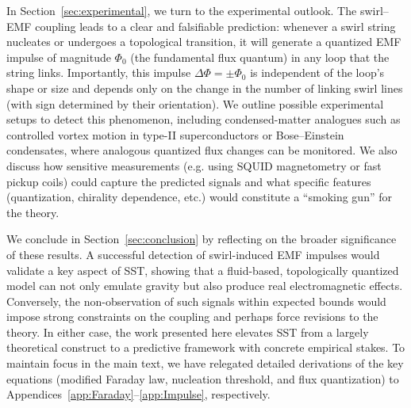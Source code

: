 \documentclass[12pt]{article}
\begin{document}
    In Section~\ref{sec:experimental}, we turn to the experimental outlook. The swirl–EMF coupling leads to a clear and falsifiable prediction: whenever a swirl string nucleates or undergoes a topological transition, it will generate a quantized EMF impulse of magnitude $\Phi_{0}$ (the fundamental flux quantum) in any loop that the string links. Importantly, this impulse $\Delta\Phi=\pm \Phi_{0}$ is independent of the loop's shape or size and depends only on the change in the number of linking swirl lines (with sign determined by their orientation). We outline possible experimental setups to detect this phenomenon, including condensed-matter analogues such as controlled vortex motion in type-II superconductors or Bose–Einstein condensates, where analogous quantized flux changes can be monitored. We also discuss how sensitive measurements (e.g. using SQUID magnetometry or fast pickup coils) could capture the predicted signals and what specific features (quantization, chirality dependence, etc.) would constitute a ``smoking gun'' for the theory.

    We conclude in Section~\ref{sec:conclusion} by reflecting on the broader significance of these results. A successful detection of swirl-induced EMF impulses would validate a key aspect of SST, showing that a fluid-based, topologically quantized model can not only emulate gravity but also produce real electromagnetic effects. Conversely, the non-observation of such signals within expected bounds would impose strong constraints on the coupling and perhaps force revisions to the theory. In either case, the work presented here elevates SST from a largely theoretical construct to a predictive framework with concrete empirical stakes. To maintain focus in the main text, we have relegated detailed derivations of the key equations (modified Faraday law, nucleation threshold, and flux quantization) to Appendices~\ref{app:Faraday}--\ref{app:Impulse}, respectively.
\end{document}
